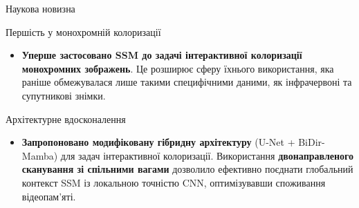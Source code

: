 \begin{frame}{Наукова новизна}
    \begin{block}{Першість у монохромній колоризації}
        \begin{itemize}
            \item \textbf{Уперше застосовано SSM до задачі інтерактивної колоризації монохромних зображень}. Це розширює сферу їхнього використання, яка раніше обмежувалася лише такими специфічними даними, як інфрачервоні та супутникові знімки.
        \end{itemize}
    \end{block}
    \begin{exampleblock}{Архітектурне вдосконалення}
        \begin{itemize}
            \item \textbf{Запропоновано модифіковану гібридну архітектуру} (U-Net + BiDir-Mamba) для задач інтерактивної колоризації. Використання \textbf{двонаправленого сканування зі спільними вагами} дозволило ефективно поєднати глобальний контекст SSM із локальною точністю CNN, оптимізувавши споживання відеопам'яті.
        \end{itemize}
    \end{exampleblock}
\end{frame}